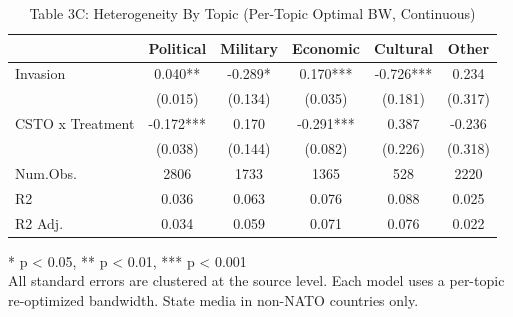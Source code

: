 \begin{table}[!t]
\caption{Table 3C: Heterogeneity By Topic (Per-Topic Optimal BW, Continuous)} 
\fontsize{12.0pt}{14.4pt}\selectfont
\begin{tabular*}{\linewidth}{@{\extracolsep{\fill}}lccccc}
\toprule
  & Political & Military & Economic & Cultural & Other \\ 
\midrule\addlinespace[2.5pt]
Invasion & 0.040** & -0.289* & 0.170*** & -0.726*** & 0.234 \\ 
 & (0.015) & (0.134) & (0.035) & (0.181) & (0.317) \\ 
CSTO x Treatment & -0.172*** & 0.170 & -0.291*** & 0.387 & -0.236 \\ 
{} & {(0.038)} & {(0.144)} & {(0.082)} & {(0.226)} & {(0.318)} \\ 
Num.Obs. & 2806 & 1733 & 1365 & 528 & 2220 \\ 
R2 & 0.036 & 0.063 & 0.076 & 0.088 & 0.025 \\ 
R2 Adj. & 0.034 & 0.059 & 0.071 & 0.076 & 0.022 \\ 
\bottomrule
\end{tabular*}
\begin{minipage}{\linewidth}
* p < 0.05, ** p < 0.01, *** p < 0.001\\
All standard errors are clustered at the source level. Each model uses a
per-topic re-optimized bandwidth. State media in non-NATO countries only.\\
\end{minipage}
\end{table}

